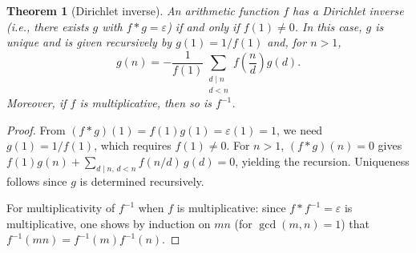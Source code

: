 \documentclass[12pt,a4paper,openany]{book}
\theoremstyle{definition}
\theoremstyle{plain}
\newtheorem{theorem}[definition]{Theorem}
\theoremstyle{remark}
\begin{document}
\begin{theorem}[Dirichlet inverse]\label{thm:dirichlet-inverse}
An arithmetic function $f$ has a Dirichlet inverse (i.e., there exists $g$
with $f \ast g = \varepsilon$) if and only if $f(1) \neq 0$.  In this case,
$g$ is unique and is given recursively by $g(1) = 1/f(1)$ and, for $n > 1$,
\[
  g(n) = -\frac{1}{f(1)} \sum_{\substack{d \mid n \\ d < n}}
         f\!\left(\frac{n}{d}\right) g(d).
\]
Moreover, if $f$ is multiplicative, then so is $f^{-1}$.
\end{theorem}

\begin{proof}
From $(f\ast g)(1) = f(1)g(1) = \varepsilon(1) = 1$, we need $g(1) = 1/f(1)$,
which requires $f(1)\neq 0$.  For $n > 1$,
$(f\ast g)(n) = 0$ gives
$f(1)g(n) + \sum_{d\mid n,\, d<n} f(n/d)\,g(d) = 0$,
yielding the recursion.  Uniqueness follows since $g$ is determined
recursively.

For multiplicativity of $f^{-1}$ when $f$ is multiplicative: since
$f \ast f^{-1} = \varepsilon$ is multiplicative, one shows by induction
on $mn$ (for $\gcd(m,n)=1$) that $f^{-1}(mn) = f^{-1}(m)f^{-1}(n)$.
\end{proof}

\begin{center}
\label{fig:dirichlet-conv}
\end{center}
\end{document}

